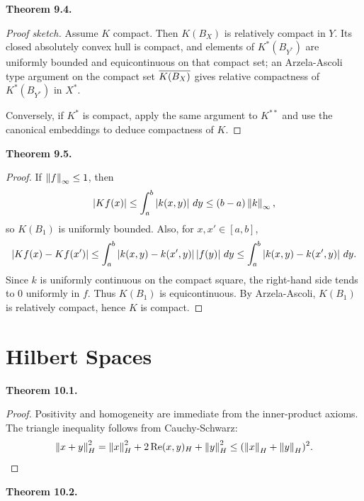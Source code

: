 \documentclass[11pt]{article}
\newenvironment{theoremstmt}[1]{%
  \par\medskip\noindent\textbf{Theorem #1. }\itshape
}{\par\medskip}
\begin{document}
\begin{theoremstmt}{9.4}
\thmSchauder
\end{theoremstmt}

\begin{proof}[Proof sketch]
Assume $K$ compact. Then $K(B_X)$ is relatively compact in $Y$. Its closed absolutely convex hull is compact, and elements of $K^*(B_{Y^*})$ are uniformly bounded and equicontinuous on that compact set; an Arzela-Ascoli type argument on the compact set $\overline{K(B_X)}$ gives relative compactness of $K^*(B_{Y^*})$ in $X^*$.

Conversely, if $K^*$ is compact, apply the same argument to $K^{**}$ and use the canonical embeddings to deduce compactness of $K$.
\end{proof}

\begin{theoremstmt}{9.5}
\thmIntegralOperator
\end{theoremstmt}

\begin{proof}
If $\left\lVert f\right\rVert_\infty\le 1$, then
\[
\left\lvert Kf(x)\right\rvert\le \int_a^b \left\lvert k(x,y)\right\rvert\,dy\le (b-a)\left\lVert k\right\rVert_\infty,
\]
so $K(B_1)$ is uniformly bounded. Also, for $x,x'\in[a,b]$,
\[
\left\lvert Kf(x)-Kf(x')\right\rvert
\le \int_a^b \left\lvert k(x,y)-k(x',y)\right\rvert\left\lvert f(y)\right\rvert\,dy
\le \int_a^b \left\lvert k(x,y)-k(x',y)\right\rvert\,dy.
\]
Since $k$ is uniformly continuous on the compact square, the right-hand side tends to $0$ uniformly in $f$. Thus $K(B_1)$ is equicontinuous. By Arzela-Ascoli, $K(B_1)$ is relatively compact, hence $K$ is compact.
\end{proof}

\section{Hilbert Spaces}

\begin{theoremstmt}{10.1}
\thmInnerProductNorm
\end{theoremstmt}

\begin{proof}
Positivity and homogeneity are immediate from the inner-product axioms. The triangle inequality follows from Cauchy-Schwarz:
\[
\left\lVert x+y\right\rVert_H^2=\left\lVert x\right\rVert_H^2+2\operatorname{Re}(x,y)_H+\left\lVert y\right\rVert_H^2
\le (\left\lVert x\right\rVert_H+\left\lVert y\right\rVert_H)^2.
\]
\end{proof}

\begin{theoremstmt}{10.2}
\thmCauchySchwarz
\end{theoremstmt}
\end{document}
